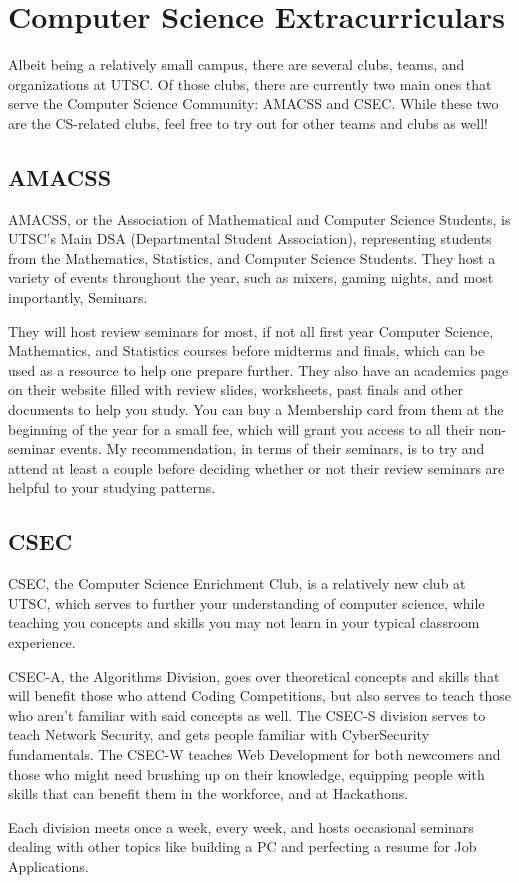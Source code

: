 \documentclass[11pt]{article}
\begin{document}
\section{Computer Science Extracurriculars}
Albeit being a relatively small campus, there are several clubs, teams, and organizations at UTSC.  Of those clubs, there are currently two main ones that serve the Computer Science Community: AMACSS and CSEC.  While these two are the CS-related clubs, feel free to try out for other teams and clubs as well!

\subsection{AMACSS}
AMACSS, or the Association of Mathematical and Computer Science Students, is UTSC's Main DSA (Departmental Student Association), representing students from the Mathematics, Statistics, and Computer Science Students.  They host a variety of events throughout the year, such as mixers, gaming nights, and most importantly, Seminars.\par
They will host review seminars for most, if not all first year Computer Science, Mathematics, and Statistics courses before midterms and finals, which can be used as a resource to help one prepare further. They also have an academics page on their website filled with review slides, worksheets, past finals and other documents to help you study. You can buy a Membership card from them at the beginning of the year for a small fee, which will grant you access to all their non-seminar events.  My recommendation, in terms of their seminars, is to try and attend at least a couple before deciding whether or not their review seminars are helpful to your studying patterns.

\subsection{CSEC}
CSEC, the Computer Science Enrichment Club, is a relatively new club at UTSC, which serves to further your understanding of computer science, while teaching you concepts and skills you may not learn in your typical classroom experience.\par
CSEC-A, the Algorithms Division, goes over theoretical concepts and skills that will benefit those who attend Coding Competitions, but also serves to teach those who aren't familiar with said concepts as well.  The CSEC-S division serves to teach Network Security, and gets people familiar with CyberSecurity fundamentals.  The CSEC-W teaches Web Development for both newcomers and those who might need brushing up on their knowledge, equipping people with skills that can benefit them in the workforce, and at Hackathons.\par
Each division meets once a week, every week, and hosts occasional seminars dealing with other topics like building a PC and perfecting a resume for Job Applications.
\end{document}
